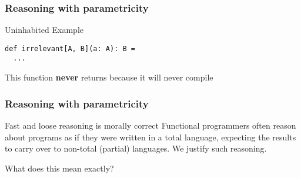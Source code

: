 \begin{frame}[fragile]
\frametitle{Reasoning with parametricity}
\begin{block}{Uninhabited Example}
\begin{lstlisting}[style=scala]
def irrelevant[A, B](a: A): B = 
  ...
\end{lstlisting}
\end{block}
\begin{theorem}This function \textbf{never} returns because it will never compile\end{theorem}
\end{frame}

\begin{frame}[fragile]
\frametitle{Reasoning with parametricity}
\begin{block}{Fast and loose reasoning is morally correct \cite{danielsson2006fast}}
\small{Functional programmers often reason about programs as if
they were written in a total language, expecting the results
to carry over to non-total (partial) languages. We justify
such reasoning.}
\end{block}
What does this mean exactly?
\end{frame}
